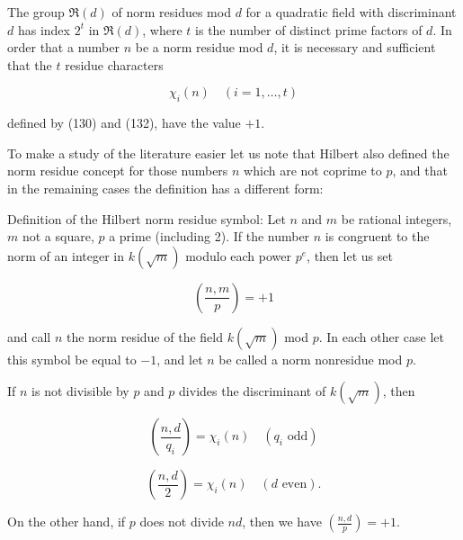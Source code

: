 The group $\mathfrak{R}(d)$ of norm residues mod $d$ for a quadratic field with discriminant $d$ has index $2^t$ in $\mathfrak{R}(d)$, where $t$ is the number of distinct prime factors of $d$. In order that a number $n$ be a norm residue mod $d$, it is necessary and sufficient that the $t$ residue characters

$$\chi_i(n) \quad (i = 1, \ldots, t)$$

defined by (130) and (132), have the value $+1$.

To make a study of the literature easier let us note that Hilbert also defined the norm residue concept for those numbers $n$ which are not coprime to $p$, and that in the remaining cases the definition has a different form:

Definition of the Hilbert norm residue symbol: Let $n$ and $m$ be rational integers, $m$ not a square, $p$ a prime (including 2). If the number $n$ is congruent to the norm of an integer in $k(\sqrt{m})$ modulo each power $p^e$, then let us set

$$\left(\frac{n, m}{p}\right) = +1$$

and call $n$ the norm residue of the field $k(\sqrt{m})$ mod $p$. In each other case let this symbol be equal to $-1$, and let $n$ be called a norm nonresidue mod $p$.

If $n$ is not divisible by $p$ and $p$ divides the discriminant of $k(\sqrt{m})$, then

$$\left(\frac{n, d}{q_i}\right) = \chi_i(n) \quad (q_i \text{ odd})$$

$$\left(\frac{n, d}{2}\right) = \chi_i(n) \quad (d \text{ even}).$$

On the other hand, if $p$ does not divide $nd$, then we have $\left(\frac{n, d}{p}\right) = +1$.

